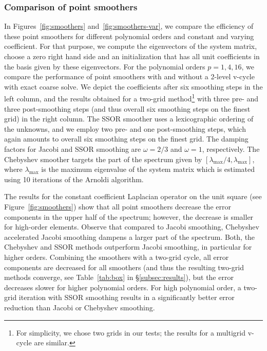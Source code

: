 \documentclass[smallcondensed,final]{svjour3}     %
\begin{document}

\subsubsection{Comparison of point smoothers}\label{subsubsec:ptsmoothcomparison}
In Figures~\ref{fig:smoothers} and~\ref{fig:smoothers-var}, we compare
the efficiency of these point smoothers for different polynomial
orders and constant and varying coefficient. For that purpose, we
compute the eigenvectors of the system matrix, choose a
zero right hand side and an initialization that has all unit
coefficients in the basis given by these eigenvectors. For the
polynomial orders $p=1,4,16$, we compare the performance of point
smoothers with and without a 2-level v-cycle with exact coarse solve. We depict the
coefficients after six smoothing steps in the left column, and the results
obtained for a two-grid method\footnote{For simplicity, we chose two
  grids in our tests; the results for a multigrid v-cycle are
  similar.} with three pre- and three post-smoothing steps (and thus overall six
smoothing steps on the finest grid) in the right column. The SSOR smoother
uses a lexicographic ordering of the unknowns, and we employ two pre- and one
post-smoothing steps, which again amounts to overall six smoothing steps
on the finest grid. The damping factors for Jacobi and SSOR smoothing
are $\omega = 2/3$ and $\omega=1$, respectively. The Chebyshev
smoother targets the part of the
spectrum given by $[\lambda_\text{max}/4,\lambda_\text{max}]$, where
$\lambda_\text{max}$ is the maximum eigenvalue of the system matrix which is estimated using 10 iterations of the Arnoldi algorithm.

The results for the constant coefficient Laplacian operator on the
unit square (see Figure~\ref{fig:smoothers}) show that all point smoothers
decrease the error components in the upper half of the spectrum;
however,
the decrease is smaller for high-order elements. Observe that compared to Jacobi smoothing, Chebyshev accelerated Jacobi smoothing dampens a larger
part of the spectrum.  Both, the Chebyshev and
SSOR methods outperform Jacobi smoothing, in particular for higher
orders. Combining the smoothers with a two-grid cycle, all error
components are decreased for all smoothers (and thus the resulting
two-grid methods converge, see Table~\ref{tab:box} in \S\ref{subsec:results}), but the error decreases slower for
higher polynomial orders. For high polynomial order, a two-grid
iteration with SSOR smoothing results in a significantly better error
reduction than Jacobi or Chebyshev smoothing.
\end{document}
